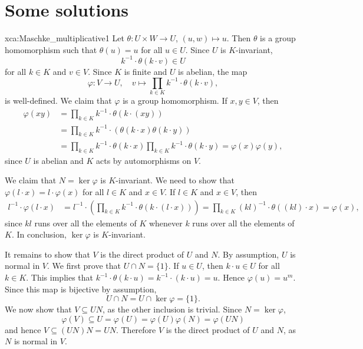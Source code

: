 \section*{Some solutions}

\pagestyle{plain}
\fancyhf{}
\fancyfoot[CE,CO]{\leftmark}
\fancyfoot[LE,RO]{\thepage}

\begin{sol}{xca:Maschke_multiplicative1}
Let $\theta\colon U\times W\to U$, $(u,w)\mapsto u$. Then $\theta$ is a group homomorphism such that 
$\theta(u)=u$ for all $u\in U$. Since $U$ is $K$-invariant, 
\[
k^{-1}\cdot \theta(k\cdot v)\in U
\]
for all $k\in K$ and $v\in V$. 
Since $K$ is finite and $U$ is abelian, 
the map 
\[
\varphi\colon V\to U,\quad 
v\mapsto \prod_{k\in K}k^{-1}\cdot \theta(k\cdot v), 
\]
is well-defined. 
We claim that $\varphi$ is a group homomorphism. If $x,y\in V$, then 
\begin{align*}
    \varphi(xy) &= \prod_{k\in K}k^{-1}\cdot \theta(k\cdot (xy))\\
    &= \prod_{k\in K}k^{-1}\cdot (\theta(k\cdot x)\theta(k\cdot y))\\
    &= \prod_{k\in K}k^{-1}\cdot \theta(k\cdot x) \prod_{k\in K}k^{-1}\cdot \theta(k\cdot y)=\varphi(x)\varphi(y),
\end{align*}
since $U$ is abelian and $K$ acts by automorphisms on $V$. 

We claim that $N=\ker\varphi$ is $K$-invariant. 
We need to show that $\varphi(l\cdot x)=l\cdot\varphi(x)$ for all $l\in K$ and $x\in V$. 
If $l\in K$ and $x\in V$, then 
\begin{align*}
l^{-1}\cdot\varphi(l\cdot x)&=l^{-1}\cdot\left(\prod_{k\in K}k^{-1}\cdot \theta(k\cdot (l\cdot x))\right)=\prod_{k\in K}(kl)^{-1}\cdot\theta( (kl)\cdot x)=\varphi(x),
\end{align*}
since $kl$ runs over all the elements of $K$ whenever $k$ runs over all the elements of $K$.
In conclusion, $\ker\varphi$ is $K$-invariant. 

It remains to show that $V$ is the direct product of $U$ and $N$. By assumption, $U$ is normal in $V$. 
We first prove that $U\cap N=\{1\}$. If $u\in U$, then $k\cdot u\in U$ for all $k\in K$. This implies that 
$k^{-1}\cdot\theta(k\cdot u)=k^{-1}\cdot (k\cdot u)=u$. Hence $\varphi(u)=u^m$. Since this map is bijective by assumption,  
\[
U\cap N=U\cap\ker\varphi=\{1\}.
\]
We now show that $V\subseteq UN$, as the other inclusion is trivial. Since $N=\ker\varphi$,  
\[
\varphi(V)\subseteq U=\varphi(U)=\varphi(U)\varphi(N)=\varphi(UN) 
\]
and hence $V\subseteq (UN)N=UN$. 
Therefore $V$ is the direct product of $U$ and $N$, as $N$ is normal in $V$.
\end{sol}

